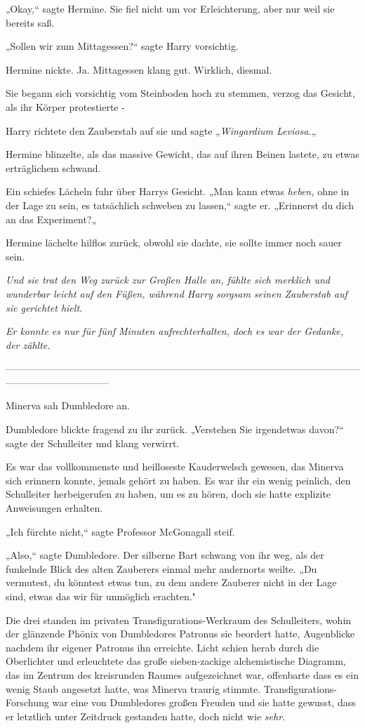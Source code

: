 {„Okay,“ sagte Hermine. Sie fiel nicht um vor Erleichterung, aber nur weil sie bereits saß.

„Sollen wir zum Mittagessen?“ sagte Harry vorsichtig.

Hermine nickte. Ja. Mittagessen klang gut. Wirklich, diesmal.

Sie begann sich vorsichtig vom Steinboden hoch zu stemmen, verzog das Gesicht, als ihr Körper protestierte -

Harry richtete den Zauberstab auf sie und sagte „\emph{Wingardium Leviosa.}„

Hermine blinzelte, als das massive Gewicht, das auf ihren Beinen lastete, zu etwas erträglichem schwand.

Ein schiefes Lächeln fuhr über Harrys Gesicht. „Man kann etwas \emph{heben,} ohne in der Lage zu sein, es tatsächlich schweben zu lassen,“ sagte er. „Erinnerst du dich an das Experiment?„

Hermine lächelte hilflos zurück, obwohl sie dachte, sie sollte immer noch sauer sein.

\emph{Und sie trat den Weg zurück zur Großen Halle an, fühlte sich merklich und wunderbar leicht auf den Füßen, während Harry sorgsam seinen Zauberstab auf sie gerichtet hielt.}

\emph{Er konnte es nur für fünf Minuten aufrechterhalten, doch es war der Gedanke, der zählte.}

--------------------------------------------------------------------------------------------------------------------------------------------

\hfill\break Minerva sah Dumbledore an.

Dumbledore blickte fragend zu ihr zurück. „Verstehen Sie irgendetwas davon?“ sagte der Schulleiter und klang verwirrt.

Es war das vollkommenste und heilloseste Kauderwelsch gewesen, das Minerva sich erinnern konnte, jemals gehört zu haben. Es war ihr ein wenig peinlich, den Schulleiter herbeigerufen zu haben, um es zu hören, doch sie hatte explizite Anweisungen erhalten.

„Ich fürchte nicht,“ sagte Professor McGonagall steif.

„Also,“ sagte Dumbledore. Der silberne Bart schwang von ihr weg, als der funkelnde Blick des alten Zauberers einmal mehr andernorts weilte. „Du vermutest, du könntest etwas tun, zu dem andere Zauberer nicht in der Lage sind, etwas das wir für unmöglich erachten."

Die drei standen im privaten Transfigurations-Werkraum des Schulleiters, wohin der glänzende Phönix von Dumbledores Patronus sie beordert hatte, Augenblicke nachdem ihr eigener Patronus ihn erreichte. Licht schien herab durch die Oberlichter und erleuchtete das große sieben-zackige alchemistische Diagramm, das im Zentrum des kreisrunden Raumes aufgezeichnet war, offenbarte dass es ein wenig Staub angesetzt hatte, was Minerva traurig stimmte. Transfigurations-Forschung war eine von Dumbledores großen Freuden und sie hatte gewusst, dass er letztlich unter Zeitdruck gestanden hatte, doch nicht wie \emph{sehr.}

}
